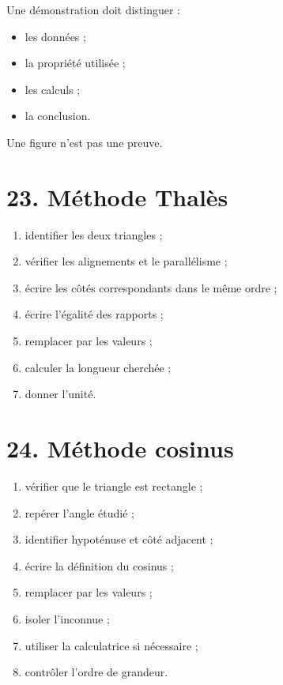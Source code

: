 Une démonstration doit distinguer :
\begin{itemize}
\item les données ;
\item la propriété utilisée ;
\item les calculs ;
\item la conclusion.
\end{itemize}

Une figure n'est pas une preuve.

\section{23. Méthode Thalès}

\begin{methode}
\begin{enumerate}
\item identifier les deux triangles ;
\item vérifier les alignements et le parallélisme ;
\item écrire les côtés correspondants dans le même ordre ;
\item écrire l'égalité des rapports ;
\item remplacer par les valeurs ;
\item calculer la longueur cherchée ;
\item donner l'unité.
\end{enumerate}
\end{methode}

\section{24. Méthode cosinus}

\begin{methode}
\begin{enumerate}
\item vérifier que le triangle est rectangle ;
\item repérer l'angle étudié ;
\item identifier hypoténuse et côté adjacent ;
\item écrire la définition du cosinus ;
\item remplacer par les valeurs ;
\item isoler l'inconnue ;
\item utiliser la calculatrice si nécessaire ;
\item contrôler l'ordre de grandeur.
\end{enumerate}
\end{methode}

